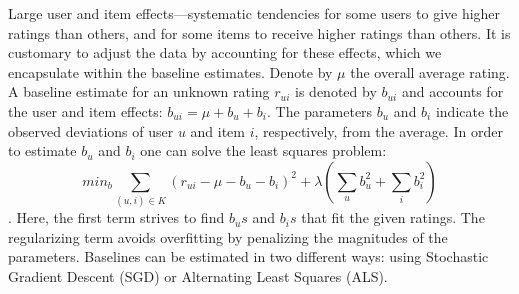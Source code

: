 
Large user and item effects—systematic tendencies for some users to give higher ratings than others, and for some items to receive higher ratings than others. It is customary to adjust the data by accounting for
these effects, which we encapsulate within the baseline estimates. Denote by $\mu$ the overall average rating. A baseline estimate for an unknown rating $r_{ui}$ is denoted by $b_{ui}$ and accounts for the user and item effects: $b_{ui} = \mu + b_u + b_i$. The parameters $b_u$ and $b_i$ indicate the observed deviations of user $u$ and item $i$, respectively, from the average. In order to estimate $b_u$ and $b_i$ one can solve
the least squares problem: 
$$min_{b} \sum_{(u,i)\in K} (r_{ui}-\mu-b_u-b_i)^2+\lambda(\sum_u b_u^2 +\sum_i b_i^2)$$.
 Here, the first term strives to find $b_us$ and $b_is$ that fit the given ratings. The regularizing term avoids overfitting by penalizing the magnitudes of the parameters. Baselines can be estimated in two different ways: using Stochastic Gradient Descent (SGD) or Alternating Least Squares (ALS).


